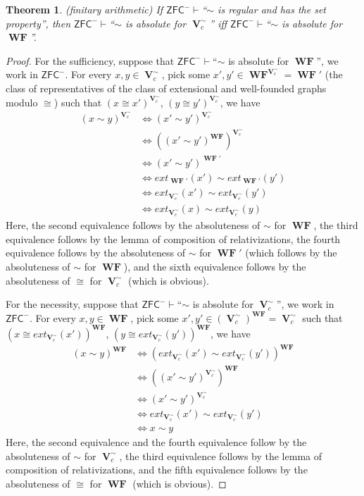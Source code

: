 \documentclass{amsart}
\newcommand{\zfc}{\mathsf{ZFC}}
\DeclareMathOperator{\uni}{\mathbf{V}}
\DeclareMathOperator{\wf}{\mathbf{WF}}
\newtheorem{theorem}{Theorem}
\begin{document}
\begin{theorem}
    (finitary arithmetic) If $\zfc^-\vdash$``$\sim$ is regular and has the set property'', then $\zfc^-\vdash$``$\sim$ is absolute for $\uni_c^\sim$'' iff $\zfc^-\vdash$``$\sim$ is absolute for $\wf$''.
\end{theorem}

\begin{proof}
    For the sufficiency, suppose that $\zfc^-\vdash$``$\sim$ is absolute for $\wf$'', we work in $\zfc^-$.
    For every $x,y\in\uni_c^\sim$, pick some $x',y'\in\wf^{\uni_c^\sim}=\wf'$ (the class of representatives of the class of extensional and well-founded graphs modulo $\cong$) such that $(x\cong x')^{\uni_c^\sim}$, $(y\cong y')^{\uni_c^\sim}$, we have
    \begin{align*}
        (x\sim y)^{\uni_c^\sim}&\Leftrightarrow(x'\sim y')^{\uni_c^\sim}\\
        &\Leftrightarrow ((x'\sim y')^{\wf})^{\uni_c^\sim}\\
        &\Leftrightarrow (x'\sim y')^{\wf'}\\
        &\Leftrightarrow ext_{\wf'}(x')\sim ext_{\wf'}(y')\\
        &\Leftrightarrow ext_{\uni_c^\sim}(x')\sim ext_{\uni_c^\sim}(y')\\
        &\Leftrightarrow ext_{\uni_c^\sim}(x)\sim ext_{\uni_c^\sim}(y)
    \end{align*}
    Here, the second equivalence follows by the absoluteness of $\sim$ for $\wf$, the third equivalence follows by the lemma of composition of relativizations, the fourth equivalence follows by the absoluteness of $\sim$ for $\wf'$ (which follows by the absoluteness of $\sim$ for $\wf$), and the sixth equivalence follows by the absoluteness of $\cong$ for $\uni_c^\sim$ (which is obvious).
    
    For the necessity, suppose that $\zfc^-\vdash$``$\sim$ is absolute for $\uni_c^\sim$'', we work in $\zfc^-$. For every $x,y\in\wf$, pick some $x',y'\in(\uni_c^\sim)^{\wf}=\uni_c^\sim$ such that $(x\cong ext_{\uni_c^\sim}(x'))^{\wf}$, $(y\cong ext_{\uni_c^\sim}(y'))^{\wf}$, we have
    \begin{align*}
        (x\sim y)^{\wf}&\Leftrightarrow(ext_{\uni_c^\sim}(x')\sim ext_{\uni_c^\sim}(y'))^{\wf}\\
        &\Leftrightarrow ((x'\sim y')^{\uni_c^\sim})^{\wf}\\
        &\Leftrightarrow (x'\sim y')^{\uni_c^\sim}\\
        &\Leftrightarrow ext_{\uni_c^\sim}(x')\sim ext_{\uni_c^\sim}(y')\\
        &\Leftrightarrow x\sim y
    \end{align*}
    Here, the second equivalence and the fourth equivalence follow by the absoluteness of $\sim$ for $\uni_c^\sim$, the third equivalence follows by the lemma of composition of relativizations, and the fifth equivalence follows by the absoluteness of $\cong$ for $\wf$ (which is obvious).
\end{proof}
\end{document}
